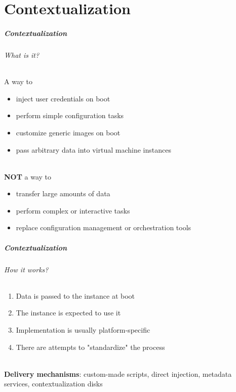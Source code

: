 \label{part_contextualization}
\part{Contextualization}

\begin{frame}
  \frametitle{Contextualization}
  \framesubtitle{What is it?}

  A way to
  \begin{itemize}
    \item inject user credentials on boot
    \item perform simple configuration tasks
    \item customize generic images on boot
    \item pass arbitrary data into virtual machine instances
  \end{itemize}

  \hfill\\

  \textbf{NOT} a way to
  \begin{itemize}
    \item transfer large amounts of data
    \item perform complex or interactive tasks
    \item replace configuration management or orchestration tools
  \end{itemize}
\end{frame}

\begin{frame}
  \frametitle{Contextualization}
  \framesubtitle{How it works?}

  \begin{enumerate}
    \item Data is passed to the instance at boot
    \item The instance is expected to use it
    \item Implementation is usually platform-specific
    \item There are attempts to "standardize" the process
  \end{enumerate}

  \hfill\\

  \textbf{Delivery mechanisms}: custom-made scripts, direct injection, metadata services, contextualization disks
\end{frame}

